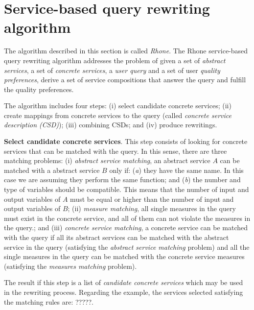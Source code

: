 \section{Service-based query rewriting algorithm}
The algorithm described in this section is called \textit{Rhone}. 
The Rhone service-based query rewriting algorithm addresses the problem of given a set of \textit{abstract services}, a set of \textit{concrete services}, a \textit{user query} and a set of user \textit{quality preferences}, derive a set of service compositions that answer the query and fulfill the quality preferences.

The algorithm includes four steps: (i) select candidate concrete services; (ii) create mappings from concrete services to the query (called \textit{concrete service description (CSD)}); (iii) combining CSDs; and (iv) produce rewritings.

\noindent \textbf{Select candidate concrete services}. This step consists of looking for concrete services that can be matched with the query. In this sense, there are three matching problems: (i) \textit{abstract service matching}, an abstract service $A$ can be matched with a abstract service $B$ only if: (\textit{a}) they have the same name. In this case we are assuming they perform the same function; and (\textit{b}) the number and type of variables should be compatible. This means that the number of input and output variables of $A$ must be equal or higher than the number of input and output variables of $B$; (ii) \textit{measure matching}, all single measures in the query must exist in the concrete service, and all of them can not violate the measures in the query.; and (iii) \textit{concrete service matching}, a concrete service can be matched with the query if all its abstract services can be matched with the abstract service in the query (satisfying the \textit{abstract service matching} problem) and all the single measures in the query can be matched with the concrete service measures (satisfying the \textit{measures matching} problem).

The result if this step is a list of \textit{candidate concrete services} which may be used in the rewriting process. Regarding the example, the services selected satisfying the matching rules are: ?????.

